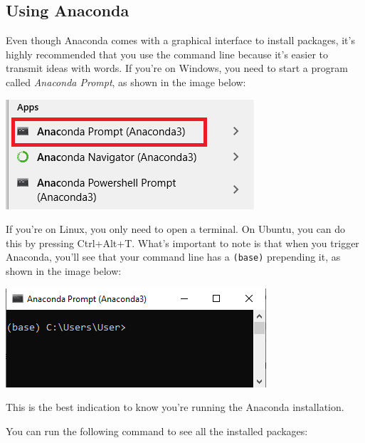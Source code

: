 
\subsection{Using Anaconda}\label{subsec:using-anaconda}
Even though Anaconda comes with a graphical interface to install packages, it's highly recommended that you use the command line because it's easier to transmit ideas with words. If you're on Windows, you need to start a program called \emph{Anaconda Prompt}, as shown in the image below:

\begin{center}
\includegraphics[width=.5\textwidth]{images/Chapter_02/AnacondaPrompt_Menu.png}
\end{center}

If you're on Linux, you only need to open a terminal. On Ubuntu, you can do this by pressing Ctrl+Alt+T. What's important to note is that when you trigger Anaconda, you'll see that your command line has a \texttt{(base)} prepending it, as shown in the image below:

\begin{center}
\includegraphics[width=.5\textwidth]{images/Chapter_02/AnacondaPrompt.png}
\end{center}

This is the best indication to know you're running the Anaconda installation.

You can run the following command to see all the installed packages:

